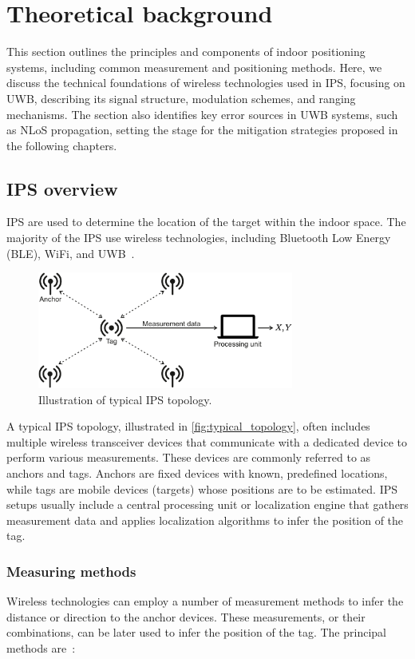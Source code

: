 \chapter{Theoretical background}
This section outlines the principles and components of indoor positioning systems, including common measurement and positioning methods. Here, we discuss the technical foundations of wireless technologies used in IPS, focusing on UWB, describing its signal structure, modulation schemes, and ranging mechanisms. The section also identifies key error sources in UWB systems, such as NLoS propagation, setting the stage for the mitigation strategies proposed in the following chapters.

\section{IPS overview}
IPS are used to determine the location of the target within the indoor space. The majority of the IPS use wireless technologies, including Bluetooth Low Energy (BLE), WiFi, and UWB~\cite{singh2024systematic}. 

\begin{figure}[tbh]
\includegraphics[width=0.75\textwidth]{Figures/theoretical_background/ips_topology.pdf}
\centering
\caption{Illustration of typical IPS topology.}
\label{fig:typical_topology}
\end{figure}

A typical IPS topology, illustrated in \autoref{fig:typical_topology}, often includes multiple wireless transceiver devices that communicate with a dedicated device to perform various measurements. These devices are commonly referred to as anchors and tags. Anchors are fixed devices with known, predefined locations, while tags are mobile devices (targets) whose positions are to be estimated. IPS setups usually include a central processing unit or localization engine that gathers measurement data and applies localization algorithms to infer the position of the tag.

\subsection{Measuring methods}
Wireless technologies can employ a number of measurement methods to infer the distance or direction to the anchor devices. These measurements, or their combinations, can be later used to infer the position of the tag. The principal methods are~\cite{mazhar2017precise}:


